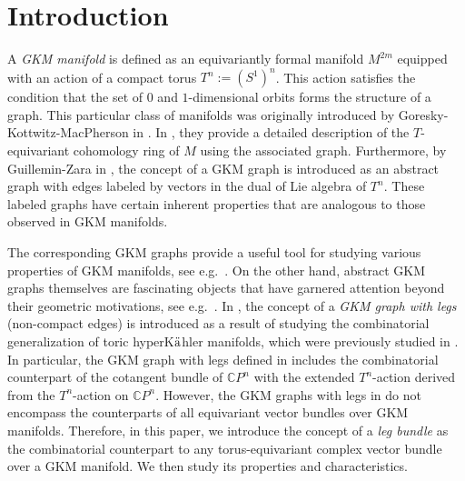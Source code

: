 \documentclass[12pt]{amsart}
\theoremstyle{definition}
\theoremstyle{remark}
\numberwithin{equation}{section}
\begin{document}
\section{Introduction}
\label{sect:1}

A \textit{GKM manifold} is defined as an equivariantly formal manifold $M^{2m}$ equipped with an action of a compact torus $T^n:=(S^1)^n$.
This action satisfies the condition that the set of $0$ and $1$-dimensional orbits forms the structure of a graph.
This particular class of manifolds was originally introduced by Goresky-Kottwitz-MacPherson in \cite{GKM}.
In \cite{GKM}, they provide a detailed description of
the $T$-equivariant cohomology ring of $M$ using the associated graph.
Furthermore, by Guillemin-Zara in \cite{GZ},
the concept of a GKM graph is introduced as an abstract graph with edges labeled by vectors in the dual of Lie algebra of $T^{n}$.
These labeled graphs have certain inherent properties that are analogous
to those observed in GKM manifolds.

The corresponding GKM graphs provide a useful tool for studying various properties of GKM manifolds, see e.g.~\cite{GZ, GKZ, GHZ, Ku16}.
On the other hand, abstract GKM graphs themselves are fascinating objects that have garnered attention beyond their geometric motivations, see e.g.~\cite{FY, FIM, Ku19, KU, MMP, S, Y}.
In \cite{KU}, the concept of a {\it GKM graph with legs} (non-compact edges) is introduced as a result of studying the combinatorial generalization of toric hyperK${\rm\ddot{a}}$hler manifolds,
which were previously studied in \cite{HP}.
In particular, the GKM graph with legs defined in \cite{KU} includes
the combinatorial counterpart of the cotangent bundle of $\mathbb{C}P^{n}$
with the extended $T^{n}$-action derived from the $T^{n}$-action on $\mathbb{C}P^{n}$.
However, the GKM graphs with legs in \cite{KU} do not encompass the counterparts of all equivariant vector bundles over GKM manifolds.
Therefore, in this paper, we introduce the concept of a {\it leg bundle} as the combinatorial counterpart to any torus-equivariant complex vector bundle over a GKM manifold.
We then study its properties and characteristics.
\end{document}
